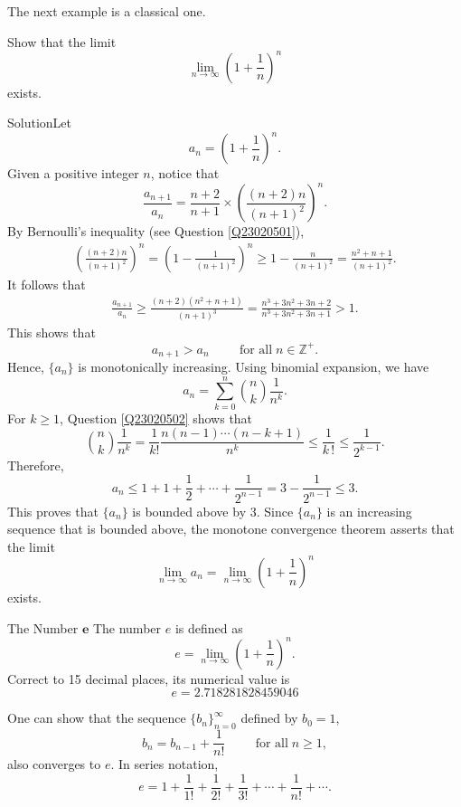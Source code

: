 The next example is a classical one.

\begin{example}[label=23020507]{}
 

Show  that the limit
\[\lim_{n\rightarrow\infty} \left(1+\frac{1}{n}\right)^n\] exists. 
 
\end{example}



\begin{solution}{Solution}Let \[a_n=\left(1+\frac{1}{n}\right)^n.\]
  Given a positive integer $n$, notice that
\[\frac{ a_{n+1}}{a_n}=\frac{n+2}{n+1}\times \left(\frac{(n+2)n}{(n+1)^2}\right)^n.\]
By Bernoulli's inequality (see Question \ref{Q23020501}), 
\begin{align*}
 \left(\frac{(n+2)n}{(n+1)^2}\right)^n=\left(1-\frac{1}{(n+1)^2}\right)^n\geq 1-\frac{n}{(n+1)^2}=\frac{n^2+n+1}{(n+1)^2}.
\end{align*}
It follows that
\begin{align*}
\frac{a_{n+1}}{a_n}\geq \frac{(n+2)(n^2+n+1)}{(n+1)^3}=\frac{n^3+3n^2+3n+2}{n^3+3n^2+3n+1}>1.
\end{align*}
This shows that 
\[a_{n+1}>a_n\hspace{1cm}\text{for all}\;n\in\mathbb{Z}^+.\]\bs
Hence, $\{a_n\}$ is monotonically increasing.
 Using binomial expansion, we have
\[a_n=\sum_{k=0}^{n}\binom{n}{k}\frac{1}{n^k}.\]
For $k\geq 1$, Question \ref{Q23020502} shows that
\[\binom{n}{k}\frac{1}{n^k}=\frac{1}{k!}\frac{n(n-1)\cdots (n-k+1)}{n^k}\leq \frac{1}{k\,!}\leq \frac{1}{2^{k-1}}.\]
Therefore,
\[a_n\leq 1+1+\frac{1}{2}+\cdots+\frac{1}{2^{n-1}}=3-\frac{1}{2^{n-1}}\leq 3.\]
This proves that $\{a_n\}$ is bounded above by 3.
  Since $\{a_n\}$ is an increasing sequence that is bounded above, the monotone convergence theorem asserts that the limit
\[\lim_{n\rightarrow\infty}a_n=\lim_{n\rightarrow\infty} \left(1+\frac{1}{n}\right)^n\] exists. 
 
\end{solution}

\begin{highlight}{The Number $\pmb{e}$}
The number $e$ is defined as  
\[e=\lim_{n\rightarrow\infty} \left(1+\frac{1}{n}\right)^n.\] Correct to 15 decimal places, its numerical value is
\[e=2.718281828459046\]

One can show that the sequence $\{b_n\}_{n=0}^{\infty}$ defined by $b_0=1$, 
\[b_n=b_{n-1}+\frac{1}{n!}\hspace{1cm}\text{for all}\; n\geq 1,\]
also converges to $e$. In series notation, 
\[e=1+\frac{1}{1!}+\frac{1}{2!}+\frac{1}{3!}+\cdots+\frac{1}{n!}+\cdots.\]
\end{highlight}


